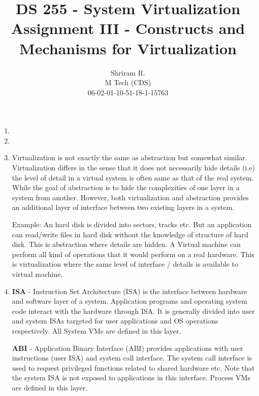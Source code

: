 \documentclass[11pt,a4paper,oneside]{article}
\begin{document}
	\title{DS 255 - System Virtualization \\ Assignment III - Constructs and Mechanisms for Virtualization}
	\author{Shriram R. \\ M Tech (CDS) \\ 06-02-01-10-51-18-1-15763}
	\maketitle	
	
	\begin{enumerate}
		\item
		\item
		\item Virtualization is not exactly the same as abstraction but somewhat similar. Virtualization differs in the sense that it does not necessarily hide details (i.e) the level of detail in a virtual system is often same as that of the real system. While the goal of abstraction is to hide the complexities of one layer in a system from another. However, both virtualization and abstraction provides an additional layer of interface between two existing layers in a system.
		
	    Example: An hard disk is divided into sectors, tracks etc. But an application can read/write files in hard disk without the knowledge of structure of hard disk. This is abstraction where details are hidden. A Virtual machine can perform all kind of operations that it would perform on a real hardware. This is virtualization where the same level of interface / details is available to virtual machine. 
		
		\item \textbf{ISA} - Instruction Set Architecture (ISA) is the interface between hardware and software layer of a system. Application programs and operating system code interact with the hardware through ISA. It is generally divided into user and system ISAs targeted for user applications and OS operations respectively. All System VMs are defined in this layer.
		
		\textbf{ABI} - Application Binary Interface (ABI) provides applications with user instructions (user ISA) and system call interface. The system call interface is used to request privileged functions related to shared hardware etc. Note that the system ISA is not exposed to applications in this interface. Process VMs are defined in this layer.
		

\end{enumerate}
\end{document}
